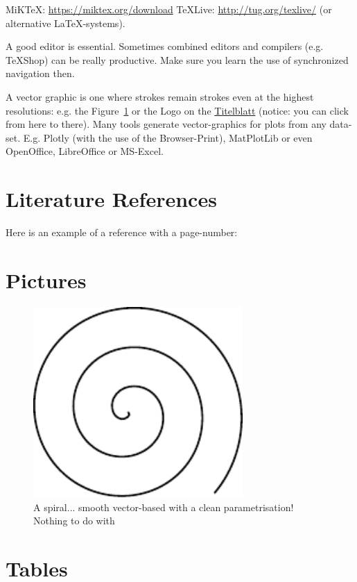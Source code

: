 MiKTeX: \url{https://miktex.org/download}
TeXLive: \url{http://tug.org/texlive/}
 (or alternative LaTeX-systems).
 
 A good editor is essential. Sometimes combined editors and compilers (e.g. TeXShop) can be really productive. Make sure you learn the use of synchronized navigation then.

A vector graphic is one where strokes remain strokes even at the highest resolutions: e.g. the Figure~\ref{fig:spiral} or the Logo on the \hyperref[titlePage]{Titelblatt} (notice: you can click from here to there).
Many tools generate vector-graphics for plots from any data-set. E.g. Plotly (with the use of the Browser-Print), MatPlotLib or even OpenOffice, LibreOffice or MS-Excel.

\section{Literature References}
Here is an example of a reference with a page-number: \cite[S. 6]{DueckKo:2016}


\section{Pictures}

\begin{figure}[h]
\centering
\includegraphics[width=8cm]{pics/spiral.pdf}
\caption{A spiral... smooth vector-based with a clean parametrisation! \\ Nothing to do with \cite{Gage:18}}\label{fig:spiral}
\end{figure}
\FloatBarrier

\section{Tables}

